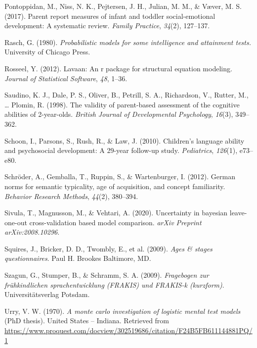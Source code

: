 \documentclass[
  man,floatsintext]{apa6}
\newlength{\cslhangindent}
\newlength{\cslentryspacingunit} %
\newenvironment{CSLReferences}[2] %
 {%
  \setlength{\parindent}{0pt}
  \ifodd #1
  \let\oldpar\par
  \def\par{\hangindent=\cslhangindent\oldpar}
  \fi
  \setlength{\parskip}{#2\cslentryspacingunit}
 }%
 {}
\begin{document}
\begin{CSLReferences}{1}{0}
\leavevmode{}%
Pontoppidan, M., Niss, N. K., Pejtersen, J. H., Julian, M. M., \& Væver, M. S. (2017). Parent report measures of infant and toddler social-emotional development: A systematic review. \emph{Family Practice}, \emph{34}(2), 127--137.

\leavevmode{}%
Rasch, G. (1980). \emph{Probabilistic models for some intelligence and attainment tests.} University of Chicago Press.

\leavevmode{}%
Rosseel, Y. (2012). Lavaan: An r package for structural equation modeling. \emph{Journal of Statistical Software}, \emph{48}, 1--36.

\leavevmode{}%
Saudino, K. J., Dale, P. S., Oliver, B., Petrill, S. A., Richardson, V., Rutter, M., \ldots{} Plomin, R. (1998). The validity of parent-based assessment of the cognitive abilities of 2-year-olds. \emph{British Journal of Developmental Psychology}, \emph{16}(3), 349--362.

\leavevmode{}%
Schoon, I., Parsons, S., Rush, R., \& Law, J. (2010). Children's language ability and psychosocial development: A 29-year follow-up study. \emph{Pediatrics}, \emph{126}(1), e73--e80.

\leavevmode{}%
Schröder, A., Gemballa, T., Ruppin, S., \& Wartenburger, I. (2012). German norms for semantic typicality, age of acquisition, and concept familiarity. \emph{Behavior Research Methods}, \emph{44}(2), 380--394.

\leavevmode{}%
Sivula, T., Magnusson, M., \& Vehtari, A. (2020). Uncertainty in bayesian leave-one-out cross-validation based model comparison. \emph{arXiv Preprint arXiv:2008.10296}.

\leavevmode{}%
Squires, J., Bricker, D. D., Twombly, E., et al. (2009). \emph{Ages \& stages questionnaires}. Paul H. Brookes Baltimore, MD.

\leavevmode{}%
Szagun, G., Stumper, B., \& Schramm, S. A. (2009). \emph{Fragebogen zur fr{ü}hkindlichen sprachentwicklung (FRAKIS) und FRAKIS-k (kurzform)}. Universitätsverlag Potsdam.

\leavevmode{}%
Urry, V. W. (1970). \emph{A monte carlo investigation of logistic mental test models} (PhD thesis). United States -- Indiana. Retrieved from \url{https://www.proquest.com/docview/302519686/citation/F24B5FB611144881PQ/1}


\end{CSLReferences}
\end{document}
